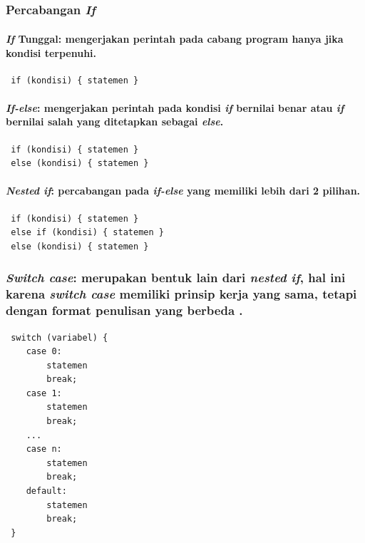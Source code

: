 \documentclass[../main.tex]{subfiles}
\begin{document}
    \subsection{{\Statement} {\Control}}
    \subsubsection{Percabangan \textit{If}}
    \paragraph{\textit{If} Tunggal: mengerjakan perintah pada cabang program hanya jika kondisi terpenuhi.}
\begin{indentlevel1}
\begin{lstlisting}
 if (kondisi) { statemen }
\end{lstlisting}
\end{indentlevel1}
    \paragraph{\textit{If-else}: mengerjakan perintah pada kondisi \textit{if} bernilai benar atau \textit{if} bernilai salah yang ditetapkan sebagai \textit{else}.}
\begin{indentlevel1}
\begin{lstlisting}
 if (kondisi) { statemen }
 else (kondisi) { statemen }
\end{lstlisting}
\end{indentlevel1}
    \paragraph{\textit{Nested if}: percabangan pada \textit{if-else} yang memiliki lebih dari 2 pilihan.}
\begin{indentlevel1}
\begin{lstlisting}
 if (kondisi) { statemen }
 else if (kondisi) { statemen }
 else (kondisi) { statemen }
\end{lstlisting}
\end{indentlevel1}
    \subsubsection{\textit{Switch case}: merupakan bentuk lain dari \textit{nested if}, hal ini karena \textit{switch case} memiliki prinsip kerja yang sama, tetapi dengan format penulisan yang berbeda \parencite{hanief2020konsep}.}
\begin{indentlevel0}
\begin{lstlisting}
 switch (variabel) {
    case 0:
        statemen
        break;
    case 1:
        statemen
        break;
    ...
    case n:
        statemen
        break;
    default:
        statemen
        break;
 }
\end{lstlisting}
\end{indentlevel0}
\end{document}
